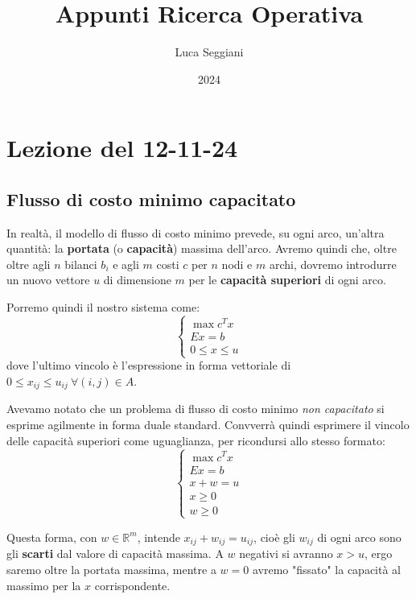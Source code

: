\documentclass[a4paper,11pt]{article}
\title{Appunti Ricerca Operativa}
\author{Luca Seggiani}
\date{2024}
\begin{document}
\section{Lezione del 12-11-24}

\thispagestyle{empty}
\pagestyle{fancy}

\subsection{Flusso di costo minimo capacitato}
In realtà, il modello di flusso di costo minimo prevede, su ogni arco, un'altra quantità: la \textbf{portata} (o \textbf{capacità}) massima dell'arco.
Avremo quindi che, oltre oltre agli $n$ bilanci $b_i$ e agli $m$ costi $c$ per $n$ nodi e $m$ archi, dovremo introdurre un nuovo vettore $u$ di dimensione $m$ per le \textbf{capacità superiori} di ogni arco.

Porremo quindi il nostro sistema come:
\[
	\begin{cases}
		\max c^T x \\ 
		Ex = b \\ 
		0 \leq x \leq u
	\end{cases}
\]
dove l'ultimo vincolo è l'espressione in forma vettoriale di $0 \leq x_{ij} \leq u_{ij} \ \forall (i, j) \in A$.

Avevamo notato che un problema di flusso di costo minimo \textit{non capacitato} si esprime agilmente in forma duale standard. 
Convverrà quindi esprimere il vincolo delle capacità superiori come uguaglianza, per ricondursi allo stesso formato:
\[
	\begin{cases}
		\max c^T x \\ 
		Ex = b \\
		x + w = u \\ 
		x \geq 0 \\ 
		w \geq 0
	\end{cases}
\]

Questa forma, con $w \in \mathbb{R}^m$, intende $x_ {ij} + w_{ij} = u_{ij}$, cioè gli $w_{ij}$ di ogni arco sono gli \textbf{scarti} dal valore di capacità massima. A $w$ negativi si avranno $x > u$, ergo saremo oltre la portata massima, mentre a $w = 0$ avremo "fissato" la capacità al massimo per la $x$ corrispondente.
\end{document}
